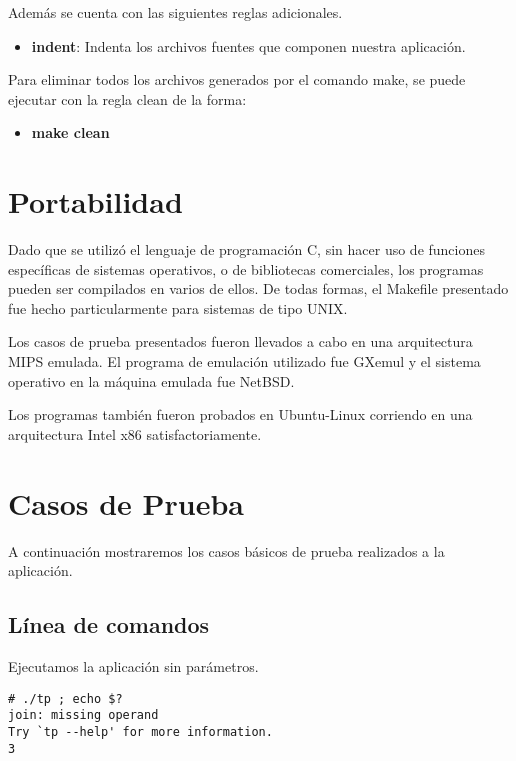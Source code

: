 \documentclass[a4paper, 10pt, twoside, notitlepage]{article}
\begin{document}
Además se cuenta con las siguientes reglas adicionales.

\begin{itemize}
 \item[] \textbf{indent}: Indenta los archivos fuentes que componen nuestra aplicación.
\end{itemize}

Para eliminar todos los archivos generados por el comando make, se puede ejecutar con la regla clean de la forma:

\begin{itemize}
 \item[] \textbf{make clean}
\end{itemize}


\section{Portabilidad}

Dado que se utilizó el lenguaje de programación C, sin hacer uso de funciones específicas de sistemas operativos,  o de bibliotecas comerciales, los programas pueden ser compilados en varios de ellos. De todas formas, el Makefile presentado fue hecho particularmente para sistemas de tipo UNIX.

Los casos de prueba presentados fueron llevados a cabo en una arquitectura MIPS emulada. El programa de emulación utilizado fue GXemul y el sistema operativo en la máquina emulada fue NetBSD.

Los programas también fueron probados en Ubuntu-Linux corriendo en una arquitectura Intel x86 satisfactoriamente.

\section{Casos de Prueba}

A continuación mostraremos los casos básicos de prueba realizados a la aplicación.

\subsection{Línea de comandos}

Ejecutamos la aplicación sin parámetros.
\scriptsize
\begin{verbatim}
# ./tp ; echo $?
join: missing operand
Try `tp --help' for more information.
3
\end{verbatim}
\normalsize
\end{document}
